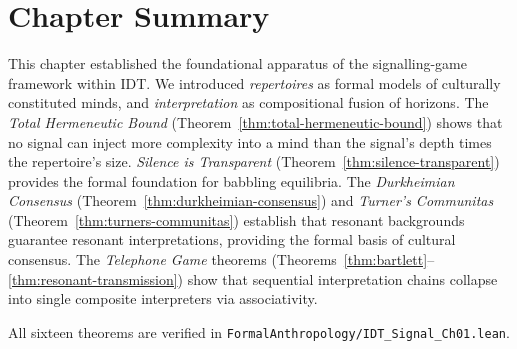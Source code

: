 \section*{Chapter Summary}

This chapter established the foundational apparatus of the signalling-game
framework within IDT\@.  We introduced \emph{repertoires} as formal models
of culturally constituted minds, and \emph{interpretation} as
compositional fusion of horizons.  The \emph{Total Hermeneutic Bound}
(Theorem~\ref{thm:total-hermeneutic-bound}) shows that no signal can
inject more complexity into a mind than the signal's depth times the
repertoire's size.  \emph{Silence is Transparent}
(Theorem~\ref{thm:silence-transparent}) provides the formal foundation
for babbling equilibria.  The \emph{Durkheimian Consensus}
(Theorem~\ref{thm:durkheimian-consensus}) and \emph{Turner's Communitas}
(Theorem~\ref{thm:turners-communitas}) establish that resonant
backgrounds guarantee resonant interpretations, providing the formal
basis of cultural consensus.  The \emph{Telephone Game} theorems
(Theorems~\ref{thm:bartlett}--\ref{thm:resonant-transmission}) show that
sequential interpretation chains collapse into single composite
interpreters via associativity.

All sixteen theorems are verified in
\texttt{FormalAnthropology/IDT\_Signal\_Ch01.lean}.

